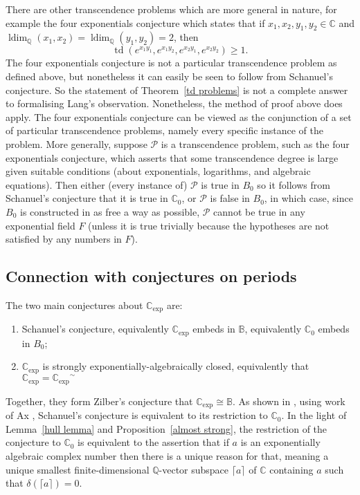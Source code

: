 \documentclass[12pt]{amsart}
\theoremstyle{definition}
\begin{document}
There are other transcendence problems which are more general in nature, for example the four exponentials conjecture which states that if $x_1, x_2, y_1, y_2 \in {\ensuremath{\mathbb{C}}}$ and $\operatorname{ldim}_{\ensuremath{\mathbb{Q}}}(x_1,x_2) = \operatorname{ldim}_{\ensuremath{\mathbb{Q}}}(y_1,y_2) = 2$, then 
\[\operatorname{td}(e^{x_1y_1}, e^{x_1y_2},e^{x_2y_1},e^{x_2y_2}) {\ensuremath{\geqslant}} 1.\]
 The four exponentials conjecture is not a particular transcendence problem as defined above, but nonetheless it can easily be seen to follow from Schanuel's conjecture. So the statement of Theorem~\ref{td problems} is not a complete answer to formalising Lang's observation. Nonetheless, the method of proof above does apply. The four exponentials conjecture can be viewed as the conjunction of a set of particular transcendence problems, namely every specific instance of the problem. More generally, suppose $\mathcal{P}$ is a transcendence problem, such as the four exponentials conjecture, which asserts that some transcendence degree is large given suitable conditions (about exponentials, logarithms, and algebraic equations). Then either (every instance of) $\mathcal{P}$ is true in $B_0$ so it follows from Schanuel's conjecture that it is true in ${\ensuremath{\mathbb{C}}}_0$, or $\mathcal{P}$ is false in $B_0$, in which case, since $B_0$ is constructed in as free a way as possible, $\mathcal{P}$ cannot be true in any exponential field $F$ (unless it is true trivially because the hypotheses are not satisfied by any numbers in $F$).

\subsection*{Connection with conjectures on periods}

The two main conjectures about ${\ensuremath{\mathbb{C}_{\mathrm{exp}}}}$ are:
\begin{enumerate}
\item Schanuel's conjecture, equivalently ${\ensuremath{\mathbb{C}_{\mathrm{exp}}}}$ embeds in ${\ensuremath{\mathbb{B}}}$, equivalently ${\ensuremath{\mathbb{C}}}_0$ embeds in $B_0$;
\item ${\ensuremath{\mathbb{C}_{\mathrm{exp}}}}$ is {strongly exponentially-algebraically closed}, equivalently that ${\ensuremath{\mathbb{C}_{\mathrm{exp}}}} = {\ensuremath{{{\ensuremath{\mathbb{C}_{\mathrm{exp}}}}}^\sim}}$
\end{enumerate}
Together, they form Zilber's conjecture that ${\ensuremath{\mathbb{C}_{\mathrm{exp}}}} {\cong} {\ensuremath{\mathbb{B}}}$. As shown in \cite{EAEF}, using work of Ax \cite{Ax71}, Schanuel's conjecture is equivalent to its restriction to ${\ensuremath{\mathbb{C}}}_0$. In the light of Lemma~\ref{hull lemma} and Proposition~\ref{almost strong}, the restriction of the conjecture to ${\ensuremath{\mathbb{C}}}_0$ is equivalent to the assertion that if $a$ is an exponentially algebraic complex number then there is a unique reason for that, meaning a unique smallest finite-dimensional ${\ensuremath{\mathbb{Q}}}$-vector subspace ${\ensuremath{\lceil {a}\rceil}}$ of ${\ensuremath{\mathbb{C}}}$ containing $a$ such that $\delta({\ensuremath{\lceil {a}\rceil}}) = 0$.
\end{document}
